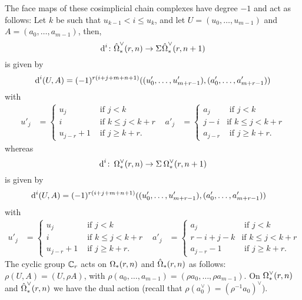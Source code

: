 	The face maps of these cosimplicial chain complexes have degree $-1$ and act as follows: Let $k$ be such that $u_{k-1}<i\leq u_k$, and let $U = (u_0,\ldots,u_{m-1})$ and $A = (a_0,\ldots,a_{m-1})$, then,
	\[
		\operatorname{d}^i\colon \hat{\operatorname{\Omega}}^{\vee}_{*}(r,n)\to \Sigma^{}\hat{\operatorname{\Omega}}^{\vee}_{*}(r,n+1)
	\]
		is given by
	\[\operatorname{d}^i(U, A) = (-1)^{r(i+j+m+n+1)}((u'_0,\ldots,u'_{m+r-1}),(a'_0,\ldots,a'_{m+r-1}))\] with
\begin{align}\label{eq:Omegahat}
	u'_j &=
	\begin{cases}
		u_j &\text{ if $j<k$} \\
		i & \text{ if $k\leq j < k+r$} \\
		u_{j-r} + 1 & \text{ if $j\geq k+r$.}
	\end{cases}
	&
	a'_j &=
	\begin{cases}
		a_j &\text{ if $j<k$} \\
		j-i & \text{if $k\leq j<k+r$} \\
		a_{j-r} & \text{ if $j\geq k+r$.}
	\end{cases}
\end{align}
whereas
\[
	\operatorname{d}^i\colon \operatorname{\Omega}^{\vee}_{*}(r,n)\to \Sigma^{}\operatorname{\Omega}^{\vee}_{*}(r,n+1)
	\]
	is given by
\begin{align*}
	\operatorname{d}^i(U, A) &= (-1)^{r(i + j + m + n + 1)}((u'_0,\ldots,u'_{m+r-1}),(a'_0,\ldots,a'_{m+r-1}))
\end{align*}
with
\begin{align}\label{eq:Theta}
	u'_j &=
	\begin{cases}
		u_j &\text{ if $j<k$} \\
		i & \text{ if $k\leq j < k+r$} \\
		u_{j-r} + 1 & \text{ if $j\geq k+r$.}
	\end{cases}
	&
	a'_j &=
	\begin{cases}
		a_j &\text{ if $j<k$} \\
		r-i+j-k & \text{if $k\leq j<k+r$} \\
		a_{j-r}-1 & \text{ if $j\geq k+r$.}
	\end{cases}
\end{align}
The cyclic group $\mathbb{C}_r$ acts on $\operatorname{\Omega}_{*}(r,n)$ and $\hat{\operatorname{\Omega}}_{*}(r,n)$ as follows: $\rho(U,A) = (U,\rho A)$, with $\rho(a_0,\ldots,a_{m-1}) = (\rho a_0,\ldots,\rho a_{m-1})$. On $\operatorname{\Omega}^{\vee}_{*}(r,n)$ and $\hat{\operatorname{\Omega}}^{\vee}_{*}(r,n)$ we have the dual action (recall that $\rho(a_0^\vee) = (\rho^{-1}a_0)^\vee$).

